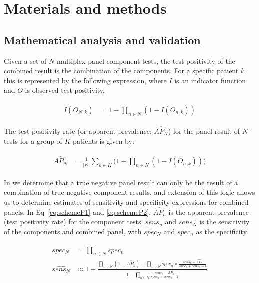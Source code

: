 \documentclass[10pt,letterpaper]{article}
\begin{document}
\section*{Materials and methods}

\subsection*{Mathematical analysis and validation}

Given a set of \(N\) multiplex panel component tests, the test positivity of the combined result is the combination of the components. For a specific patient \(k\) this is represented by the following expression, where \(I\) is an indicator function and \(O\) is observed test positivity.

\begin{eqnarray}
\begin{aligned}
I(O_{N,k}) &= 1-\prod_{n \in N}{(1-I(O_{n,k}))}
\end{aligned}
\end{eqnarray}

The test positivity rate (or apparent prevalence: \(\widehat{AP_N}\)) for the panel result of \(N\) tests for a group of \(K\) patients is given by:

\begin{eqnarray}
\begin{aligned}
\widehat{AP_N} &= \frac{1}{|K|}\sum_{k \in K}{\bigg(1-\prod_{n \in N}{(1-I(O_{n,k}))}\bigg)}
\end{aligned}
\end{eqnarray}

In  we determine that a true negative panel result can only be the result of a combination of true negative component results, and extension of this logic allows us to determine estimates of sensitivity and specificity expressions for combined panels. In Eq~\ref{eq:schemeP1} and \ref{eq:schemeP2}, \(\widehat{AP_n}\)  is the apparent prevalence (test positivity rate) for the component tests. \(sens_n\) and \(sens_N\) is the sensitivity of the components and combined panel, with \(spec_N\) and \(spec_n\) as the specificity.

\begin{eqnarray}
\label{eq:schemeP1}
\begin{aligned}
spec_N &= \prod_{n \in N}{spec_n} \\
\widehat{sens_N} &\approx 1-\frac{
  \prod_{n \in N}{(1-\widehat{AP_n})} - \prod_{n \in N}{spec_n \times \frac{sens_n-\widehat{AP_n}}{spec_n + sens_n - 1}}
}{
  1 - \prod_{n \in N}{ \frac{sens_n-\widehat{AP_n}}{spec_n + sens_n - 1} }
} \\
\end{aligned}
\end{eqnarray}
\end{document}
